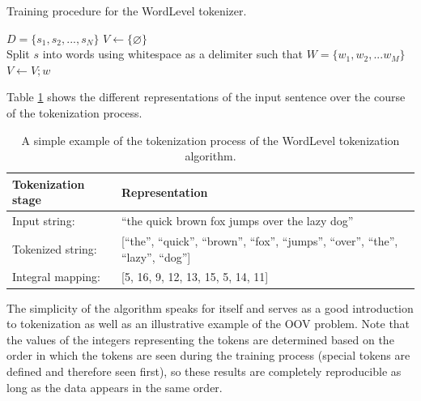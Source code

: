 \documentclass[12pt]{article}
\begin{document}
\begin{algorithm}
    \caption{Training procedure for the WordLevel tokenizer.}
    \label{alg:wordlevel_training}
    \begin{algorithmic}
        \State $D = \{s_1, s_2, ..., s_N\}$
        \State $V \gets \{\varnothing\}$
        \\

        \State Split $s$ into words using whitespace as a delimiter such that
        \State $W=\{w_1, w_2, ... w_M\}$
        \\

        \State $V \gets V;w$
        \EndIf
        \EndFor
        \EndFor
    \end{algorithmic}
\end{algorithm}

Table \ref{tab:wordlevel_tokenization_example} shows the different representations of the input sentence over the course of the tokenization process.

\begin{table}[h!]
    \centering
    \begin{tabular}{l l}
        \toprule
        Tokenization stage & Representation                                                                            \\
        \midrule
        Input string:      & ``the quick brown fox jumps over the lazy dog''                                           \\
        Tokenized string:  & [``the'', ``quick'', ``brown'', ``fox'', ``jumps'', ``over'', ``the'', ``lazy'', ``dog''] \\
        Integral mapping:  & [5, 16, 9, 12, 13, 15, 5, 14, 11]                                                         \\
        \bottomrule
    \end{tabular}
    \caption{A simple example of the tokenization process of the WordLevel tokenization algorithm.}
    \label{tab:wordlevel_tokenization_example}
\end{table}

\noindent
The simplicity of the algorithm speaks for itself and serves as a good introduction to tokenization as well as an illustrative example of the OOV
problem. Note that the values of the integers representing the tokens are determined based on the order in which the tokens are seen during the
training process (special tokens are defined and therefore seen first), so these results are completely reproducible as long as the data appears in
the same order.
\end{document}
